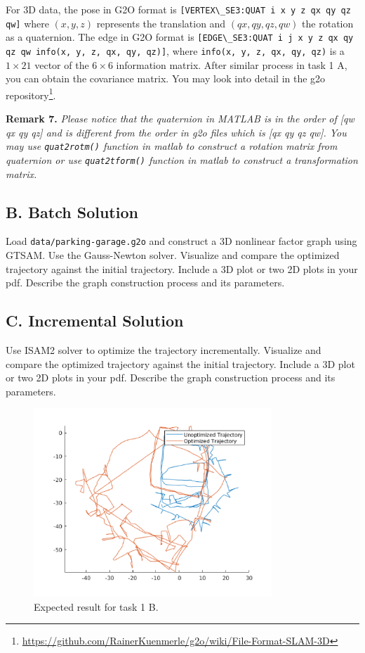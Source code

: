 \documentclass[tp]{lcc}
\begin{document}
For 3D data, the pose in G2O format is \lstinline[style=bash]{[VERTEX\_SE3:QUAT i x y z qx qy qz qw]} where $(x,y,z)$ represents the translation and $(qx,qy,qz,qw)$ the rotation as a quaternion. The edge in G2O format is \lstinline[style=bash]{[EDGE\_SE3:QUAT i j x y z qx qy qz qw info(x, y, z, qx, qy, qz)]}, where \lstinline[style=bash]{info(x, y, z, qx, qy, qz)} is a $1 \times 21$ vector of the $6 \times 6$ information matrix. After similar process in task 1 A, you can obtain the covariance matrix. You may look into detail in the g2o repository\footnote{\url{https://github.com/RainerKuenmerle/g2o/wiki/File-Format-SLAM-3D}}.

\textbf{Remark 7.} \textit{Please notice that the quaternion in MATLAB is in the order of [qw qx qy qz] and is different from the order in g2o files which is [qx qy qz qw]. You may use \lstinline[style=bash]{quat2rotm()} function in matlab to construct a rotation matrix from quaternion or use \lstinline[style=bash]{quat2tform()} function in matlab to construct a transformation matrix.}

\subsection{B. Batch Solution}
Load \lstinline[style=bash]{data/parking-garage.g2o} and construct a 3D nonlinear factor graph using GTSAM. Use the Gauss-Newton solver. Visualize and compare the optimized trajectory against the initial trajectory. Include a 3D plot or two 2D plots in your pdf. Describe the graph construction process and its parameters.

\subsection{C. Incremental Solution}
Use ISAM2 solver to optimize the trajectory incrementally. Visualize and compare the optimized trajectory against the initial trajectory. Include a 3D plot or two 2D plots in your pdf. Describe the graph construction process and its parameters.

\begin{figure}[h]
    \centering
    \includegraphics[width=0.8\textwidth]{images/result_task_1b.png}
    \caption{Expected result for task 1 B.}
    \label{fig:task1b}
\end{figure}
\end{document}
